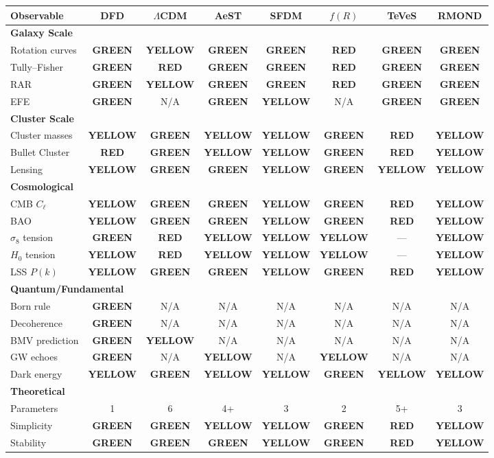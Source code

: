 \documentclass[11pt,a4paper]{article}
\newcommand{\GREEN}{\textcolor{dfdgreen}{\textbf{GREEN}}}
\newcommand{\YELLOW}{\textcolor{dfdyellow}{\textbf{YELLOW}}}
\newcommand{\RED}{\textcolor{dfdred}{\textbf{RED}}}
\begin{document}
\begin{center}
\begin{longtable}{lccccccc}
\toprule
\textbf{Observable} & \textbf{DFD} & \textbf{$\Lambda$CDM} & \textbf{AeST} & \textbf{SFDM} & \textbf{$f(R)$} & \textbf{TeVeS} & \textbf{RMOND} \\
\midrule
\endhead
\multicolumn{8}{l}{\textbf{Galaxy Scale}} \\
\midrule
Rotation curves & \GREEN & \YELLOW & \GREEN & \GREEN & \RED & \GREEN & \GREEN \\
Tully--Fisher & \GREEN & \RED & \GREEN & \GREEN & \RED & \GREEN & \GREEN \\
RAR & \GREEN & \YELLOW & \GREEN & \GREEN & \RED & \GREEN & \GREEN \\
EFE & \GREEN & N/A & \GREEN & \YELLOW & N/A & \GREEN & \GREEN \\
\midrule
\multicolumn{8}{l}{\textbf{Cluster Scale}} \\
\midrule
Cluster masses & \YELLOW & \GREEN & \YELLOW & \YELLOW & \GREEN & \RED & \YELLOW \\
Bullet Cluster & \RED & \GREEN & \YELLOW & \YELLOW & \GREEN & \RED & \YELLOW \\
Lensing & \YELLOW & \GREEN & \GREEN & \YELLOW & \GREEN & \YELLOW & \YELLOW \\
\midrule
\multicolumn{8}{l}{\textbf{Cosmological}} \\
\midrule
CMB $C_\ell$ & \YELLOW & \GREEN & \GREEN & \YELLOW & \GREEN & \RED & \YELLOW \\
BAO & \YELLOW & \GREEN & \GREEN & \YELLOW & \GREEN & \RED & \YELLOW \\
$\sigma_8$ tension & \GREEN & \RED & \YELLOW & \YELLOW & \YELLOW & --- & \YELLOW \\
$H_0$ tension & \YELLOW & \RED & \YELLOW & \YELLOW & \YELLOW & --- & \YELLOW \\
LSS $P(k)$ & \YELLOW & \GREEN & \GREEN & \YELLOW & \GREEN & \RED & \YELLOW \\
\midrule
\multicolumn{8}{l}{\textbf{Quantum/Fundamental}} \\
\midrule
Born rule & \GREEN & N/A & N/A & N/A & N/A & N/A & N/A \\
Decoherence & \GREEN & N/A & N/A & N/A & N/A & N/A & N/A \\
BMV prediction & \GREEN & \YELLOW & N/A & N/A & N/A & N/A & N/A \\
GW echoes & \GREEN & N/A & \YELLOW & N/A & \YELLOW & N/A & N/A \\
Dark energy & \YELLOW & \GREEN & \YELLOW & \YELLOW & \GREEN & \YELLOW & \YELLOW \\
\midrule
\multicolumn{8}{l}{\textbf{Theoretical}} \\
\midrule
Parameters & 1 & 6 & 4+ & 3 & 2 & 5+ & 3 \\
Simplicity & \GREEN & \GREEN & \YELLOW & \YELLOW & \GREEN & \RED & \YELLOW \\
Stability & \GREEN & \GREEN & \GREEN & \YELLOW & \GREEN & \RED & \YELLOW \\
\bottomrule
\end{longtable}
\end{center}
\end{document}
